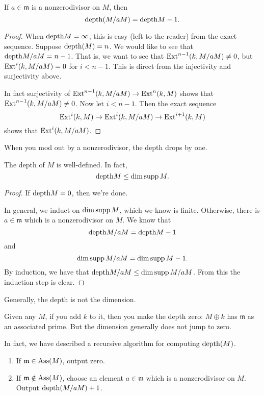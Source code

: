 \begin{corollary} 
If $a \in \mathfrak{m}$ is a nonzerodivisor on $M$, then 
\[ \mathrm{depth}(M/aM) = \mathrm{depth} M -1.  \]
\end{corollary} 
\begin{proof} 
When $\mathrm{depth} M = \infty$, this is easy (left to the reader) from
the exact
sequence. Suppose $\mathrm{depth}(M) = n$. We would like to see that
$\mathrm{depth} M/aM =
n-1$. That is, we want to see that $\mathrm{Ext}^{n-1}(k,M/aM) \neq 0$,
but
$\mathrm{Ext}^i(k,M/aM) =
0$ for $i < n-1$. This is direct from the injectivity and
surjectivity above.

In fact surjectivity of $\mathrm{Ext}^{n-1}(k,M/aM) \to \mathrm{Ext}^n(k,M)$
shows that
$\mathrm{Ext}^{n-1}(k,M/aM) \neq 0$. Now let $i < n-1$. Then the exact
sequence
\[ \mathrm{Ext}^i(k,M) \to \mathrm{Ext}^i(k,M/aM) \to \mathrm{Ext}^{i+1}(k,M)  \]
shows that $\mathrm{Ext}^i(k, M/aM)$.
\end{proof} 

When you mod out by a nonzerodivisor, the depth drops by one.

\begin{corollary} 
The depth of $M$ is well-defined. In fact, 
\[ \mathrm{depth} M \leq \dim \operatorname{supp} M.  \]
\end{corollary} 
\begin{proof} 
If $\mathrm{depth} M = 0$, then we're done.

In general, we induct on $\dim \operatorname{supp} M$, which we know is
finite. Otherwise,
there is $ a \in \mathfrak{m}$ which is a nonzerodivisor on $M$.
We know that
\[ \mathrm{depth} M/aM = \mathrm{depth} M -1  \]
and
\[ \dim \operatorname{supp} M/aM = \dim \operatorname{supp} M -1.  \]
By induction, we have that $\mathrm{depth} M/aM \leq \dim \operatorname{supp} M/aM$.
From this the
induction step is clear.
\end{proof} 

Generally, the depth is not the dimension.
\begin{example} 
Given any $M$, if you add $k$ to it, then you make the depth
zero: $M \oplus k$
has $\mathfrak{m}$ as an associated prime. But the dimension
generally does not
jump to zero.
\end{example}

In fact, we have described a recursive algorithm for computing
$\mathrm{depth}(M)$.
\begin{enumerate}
\item If $\mathfrak{m}  \in \operatorname{Ass}(M)$, output zero.
\item If $\mathfrak{m} \notin \operatorname{Ass}(M)$, choose an element $a \in
\mathfrak{m}$
which is a nonzerodivisor on $M$. Output $\mathrm{depth}(M/aM) +1$.
\end{enumerate}


